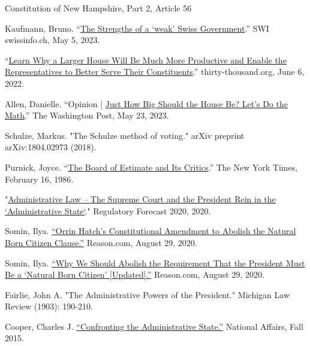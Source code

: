 \documentclass{article}
\begin{document}
\begin{thebibliography}{20}
Constitution of New Hampshire, Part 2, Article 56

Kaufmann, Bruno. “\href{https://www.swissinfo.ch/eng/business/the-strengths-of-a--weak--swiss-government/48483858. }{The Strengths of a ‘weak’ Swiss Government}.” SWI swissinfo.ch, May 5, 2023. 

“\href{https://thirty-thousand.org/the-house-of-representatives-is-scalable/}{Learn Why a Larger House Will Be Much More Productive and Enable the Representatives to Better Serve Their Constituents}.” thirty-thousand.org, June 6, 2022.

Allen, Danielle. “Opinion | \href{https://www.washingtonpost.com/opinions/2023/03/28/danielle-allen-democracy-reform-house-representatives-districts/}{Just How Big Should the House Be? Let’s Do the Math}.” The Washington Post, May 23, 2023. 

Schulze, Markus. "The Schulze method of voting." arXiv preprint arXiv:1804.02973 (2018).

Purnick, Joyce. “\href{https://www.nytimes.com/1986/02/16/weekinreview/the-board-of-estimate-and-its-critics.html}{The Board of Estimate and Its Critics}.” The New York Times, February 16, 1986.

"\href{https://www.crowell.com/a/web/bomv5ATK9LZPNrBA51skWq/4TtiyY/Regulatory-Forecast-2020-Administrative-Law-Crowell-Moring.pdf. }{Administrative Law – The Supreme Court and the President Rein in the `Administrative State`}." Regulatory Forecast 2020, 2020. 

Somin, Ilya. \href{https://reason.com/volokh/2020/08/16/orrin-hatchs-constitutional-amendment-to-abolish-the-natural-born-citizen-clause/}{“Orrin Hatch’s Constitutional Amendment to Abolish the Natural Born Citizen Clause.”} Reason.com, August 29, 2020.

Somin, Ilya. \href{https://reason.com/volokh/2020/08/14/why-we-should-abolish-the-requirement-that-the-president-must-be-a-natural-born-citizen/}{“Why We Should Abolish the Requirement That the President Must Be a ‘Natural Born Citizen’ [Updated].”} Reason.com, August 29, 2020. 

Fairlie, John A. "The Administrative Powers of the President." Michigan Law Review (1903): 190-210.

Cooper, Charles J. \href{https://www.nationalaffairs.com/publications/detail/confronting-the-administrative-state}{“Confronting the Administrative State.”} National Affairs, Fall 2015.


\end{thebibliography}
\end{document}
